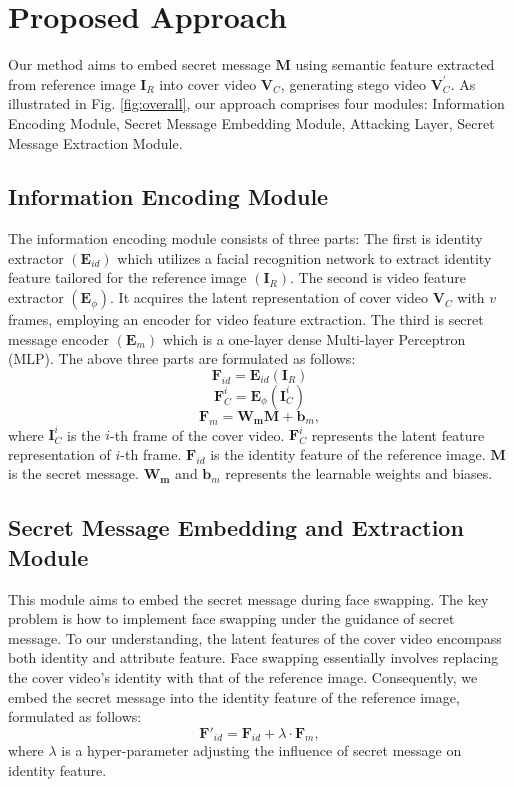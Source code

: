 \documentclass{article}
\begin{document}
\section{Proposed Approach}
Our method aims to embed secret message $\bm{M}$ using semantic feature extracted from reference image $\bm{I}_{R}$ into cover video $\bm{V}_C$, generating stego video $\bm{V}_{C}^{'}$. As illustrated in Fig. \ref{fig:overall}, our approach comprises four modules: Information Encoding Module, Secret Message Embedding Module, Attacking Layer, Secret Message Extraction Module.



\subsection{Information Encoding Module} 
The information encoding module consists of three parts: 
The first is identity extractor $\left(\bm{E}_{id}\right)$ which utilizes a facial recognition network to extract identity feature tailored for the reference image $\left(\bm{I}_R\right)$.
The second is video feature extractor $\left(\bm{E}_{\phi}\right)$. It acquires the latent representation of cover video $\bm{V}_{C}$ with $v$ frames, employing an encoder \cite{chen2020simswap} for video feature extraction.
The third is secret message encoder $\left(\bm{E}_m\right)$ which is a one-layer dense Multi-layer Perceptron (MLP).
The above three parts are formulated as follows:
\begin{equation}
    \bm{F}_{id} = \bm{E}_{id}(\bm{I}_{R})
\end{equation}
\begin{equation}
    \bm{F}^i_C = \bm{E}_{\phi}(\bm{I}_C^i)
\end{equation}
\begin{equation}
    \bm{F}_m = \bm{W_mM} + \bm{b}_m ,
\end{equation}
where $\bm{I}^i_C$ is the $i$-th frame of the cover video. 
$\bm{F}^i_{C}$ represents the latent feature representation of $i$-th frame. 
$\bm{F}_{id}$ is the identity feature of the reference image.
$\bm{M}$ is the secret message.
$\bm{W_m}$ and $\bm{b}_m$ represents the learnable weights and biases.


\subsection{Secret Message Embedding and Extraction Module} 
This module aims to embed the secret message during face swapping.
The key problem is how to implement face swapping under the guidance of secret message.
To our understanding, the latent features of the cover video encompass both identity and attribute feature.
Face swapping essentially involves replacing the cover video's identity with that of the reference image.
Consequently, we embed the secret message into the identity feature of the reference image, formulated as follows:
\begin{equation}
\bm{F}'_{id} = \bm{F}_{id}+\lambda \cdot \bm{F}_{m} ,
\label{eq:embed}
\end{equation}
where $\lambda$ is a hyper-parameter adjusting the influence of secret message on identity feature.
\end{document}
